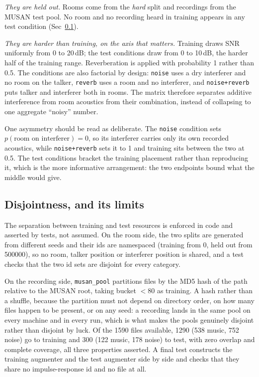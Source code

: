 \documentclass{article}
\begin{document}
\emph{They are held out.} Rooms come from the \emph{hard} split and recordings from the MUSAN test pool. No room and no recording heard in training appears in any test condition (Sec~\ref{sec:aug:disjoint}).

\emph{They are harder than training, on the axis that matters.} Training draws SNR uniformly from 0 to 20\,dB; the test conditions draw from 0 to 10\,dB, the harder half of the training range. Reverberation is applied with probability 1 rather than 0.5. The conditions are also factorial by design: \texttt{noise} uses a dry interferer and no room on the talker, \texttt{reverb} uses a room and no interferer, and \texttt{noise+reverb} puts talker and interferer both in rooms. The matrix therefore separates additive interference from room acoustics from their combination, instead of collapsing to one aggregate ``noisy'' number.

One asymmetry should be read as deliberate. The \texttt{noise} condition sets $p(\text{room on interferer}) = 0$, so its interferer carries only its own recorded acoustics, while \texttt{noise+reverb} sets it to 1 and training sits between the two at 0.5. The test conditions bracket the training placement rather than reproducing it, which is the more informative arrangement: the two endpoints bound what the middle would give.

\subsection{Disjointness, and its limits}
\label{sec:aug:disjoint}

The separation between training and test resources is enforced in code and asserted by tests, not assumed. On the room side, the two splits are generated from different seeds and their ids are namespaced (training from 0, held out from 500000), so no room, talker position or interferer position is shared, and a test checks that the two id sets are disjoint for every category.

On the recording side, \texttt{musan\_pool} partitions files by the MD5 hash of the path relative to the MUSAN root, taking bucket $< 80$ as training. A hash rather than a shuffle, because the partition must not depend on directory order, on how many files happen to be present, or on any seed: a recording lands in the same pool on every machine and in every run, which is what makes the pools genuinely disjoint rather than disjoint by luck. Of the 1590 files available, 1290 (538 music, 752 noise) go to training and 300 (122 music, 178 noise) to test, with zero overlap and complete coverage, all three properties asserted. A final test constructs the training augmenter and the test augmenter side by side and checks that they share no impulse-response id and no file at all.
\end{document}
